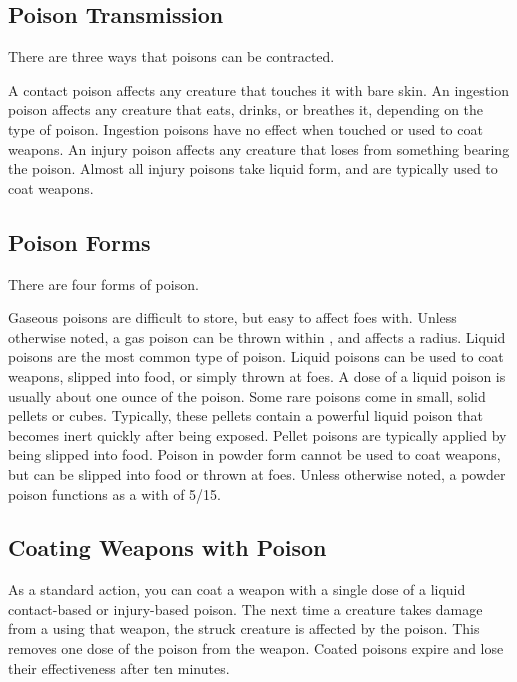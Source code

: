     \subsection{Poison Transmission}\label{Poison Transmission}\label{Transmission}

        There are three ways that poisons can be contracted.

         A contact poison affects any creature that touches it with bare skin.
         An ingestion poison affects any creature that eats, drinks, or breathes it, depending on the type of poison.
        Ingestion poisons have no effect when touched or used to coat weapons.
         An injury poison affects any creature that loses  from something bearing the poison.
        Almost all injury poisons take liquid form, and are typically used to coat weapons.

    \subsection{Poison Forms}\label{Poison Forms}

        There are four forms of poison.

         Gaseous poisons are difficult to store, but easy to affect foes with.
        Unless otherwise noted, a gas poison can be thrown within \shortrange, and affects a \tinyarea radius.
         Liquid poisons are the most common type of poison.
        Liquid poisons can be used to coat weapons, slipped into food, or simply thrown at foes.
        A dose of a liquid poison is usually about one ounce of the poison.
         Some rare poisons come in small, solid pellets or cubes.
        Typically, these pellets contain a powerful liquid poison that becomes inert quickly after being exposed.
        Pellet poisons are typically applied by being slipped into food.
         Poison in powder form cannot be used to coat weapons, but can be slipped into food or thrown at foes.
        Unless otherwise noted, a powder poison functions as a  with  of 5/15.

    \subsection{Coating Weapons with Poison}\label{Coating Weapons with Poison}
        As a standard action, you can coat a weapon with a single dose of a liquid contact-based or injury-based poison.
        The next time a creature takes damage from a  using that weapon, the struck creature is affected by the poison.
        This removes one dose of the poison from the weapon.
        Coated poisons expire and lose their effectiveness after ten minutes.

